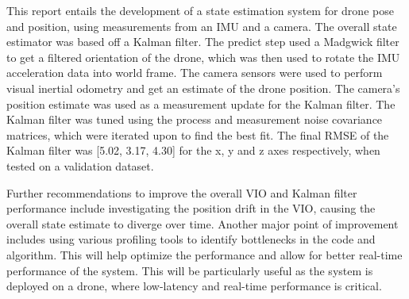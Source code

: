 \documentclass[bare_jrnl_transmag]{subfiles}
\begin{document}
This report entails the development of a state estimation system for drone pose and position, using measurements from an IMU and a camera. The overall state estimator was based off a Kalman filter. The predict step used a Madgwick filter to get a filtered orientation of the drone, which was then used to rotate the IMU acceleration data into world frame. The camera sensors were used to perform visual inertial odometry and get an estimate of the drone position. The camera's position estimate was used as a measurement update for the Kalman filter. The Kalman filter was tuned using the process and measurement noise covariance matrices, which were iterated upon to find the best fit. The final RMSE of the Kalman filter was [5.02, 3.17, 4.30] for the x, y and z axes respectively, when tested on a validation dataset.

Further recommendations to improve the overall VIO and Kalman filter performance include investigating the position drift in the VIO, causing the overall state estimate to diverge over time. Another major point of improvement includes using various profiling tools to identify bottlenecks in the code and algorithm. This will help optimize the performance and allow for better real-time performance of the system. This will be particularly useful as the system is deployed on a drone, where low-latency and real-time performance is critical.
\end{document}
